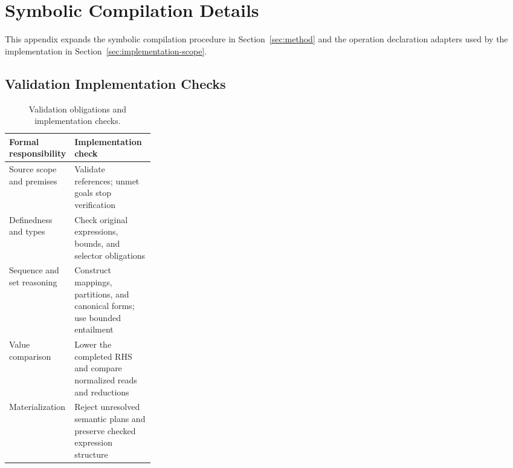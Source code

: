 \section{Symbolic Compilation Details}
\label{app:compilation}
This appendix expands the symbolic compilation procedure in
Section~\ref{sec:method} and the operation declaration adapters used by
the implementation in Section~\ref{sec:implementation-scope}.


\FloatBarrier

\FloatBarrier

\FloatBarrier

\FloatBarrier

\FloatBarrier

\FloatBarrier

\FloatBarrier


\FloatBarrier

\FloatBarrier

\subsection{Validation Implementation Checks}
\label{app:implementation-modules}
\begin{table}[!htbp]
\caption{Validation obligations and implementation checks.}
\label{tab:implementation-validation}
\small
\begin{tabularx}{\linewidth}{@{}p{0.28\linewidth}Y@{}}\toprule
Formal responsibility & Implementation check\\\midrule
Source scope and premises & Validate references; unmet goals stop verification\\
Definedness and types & Check original expressions, bounds, and selector obligations\\
Sequence and set reasoning & Construct mappings, partitions, and canonical forms; use bounded entailment\\
Value comparison & Lower the completed RHS and compare normalized reads and reductions\\
Materialization & Reject unresolved semantic plans and preserve checked expression structure\\\bottomrule
\end{tabularx}
\end{table}

\FloatBarrier

